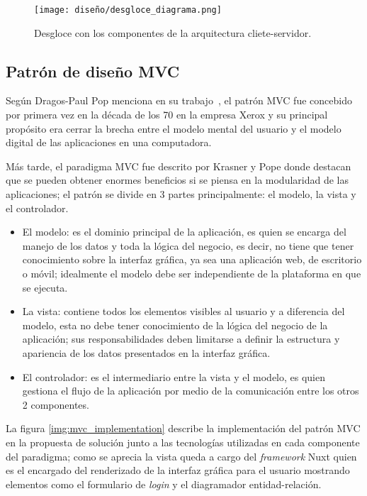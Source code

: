\begin{figure}[H]
  \centering
  \texttt{[image: diseño/desgloce\_diagrama.png]}
  \caption{Desgloce con los componentes de la arquitectura cliete-servidor.}
  \label{img:desgloce_arquitectura}
\end{figure}


\subsection{Patrón de diseño MVC}

Según Dragos-Paul Pop menciona en su trabajo~\cite{pop_designing_2014}, el patrón MVC fue concebido por primera vez en la década de los 70 en la empresa Xerox y su principal propósito era cerrar la brecha entre el modelo mental del usuario y el modelo digital de las aplicaciones en una computadora.


Más tarde, el paradigma MVC fue descrito por Krasner y Pope\cite{pope_cookbook_1988} donde destacan que se pueden obtener enormes beneficios si se piensa en la modularidad de las aplicaciones; el patrón se divide en 3 partes principalmente: el modelo, la vista y el controlador.

\begin{itemize}
    \item El modelo: es el dominio principal de la aplicación, es quien se encarga del manejo de los datos y toda la lógica del negocio, es decir, no tiene que tener conocimiento sobre la interfaz gráfica, ya sea una aplicación web, de escritorio o móvil; idealmente el modelo debe ser independiente de la plataforma en que se ejecuta.
    \item La vista: contiene todos los elementos visibles al usuario y a diferencia del modelo, esta no debe tener conocimiento de la lógica del negocio de la aplicación; sus responsabilidades deben limitarse a definir la estructura y apariencia de los datos presentados en la interfaz gráfica.
    \item El controlador: es el intermediario entre la vista y el modelo, es quien gestiona el flujo de la aplicación por medio de la comunicación entre los otros 2 componentes.
\end{itemize}

La figura \ref{img:mvc_implementation} describe la implementación del patrón MVC en la propuesta de solución junto a las tecnologías utilizadas en cada componente del paradigma; como se aprecia la vista queda a cargo del \textit{framework} Nuxt quien es el encargado del renderizado de la interfaz gráfica para el usuario mostrando elementos como el formulario de \textit{login} y el diagramador entidad-relación.

